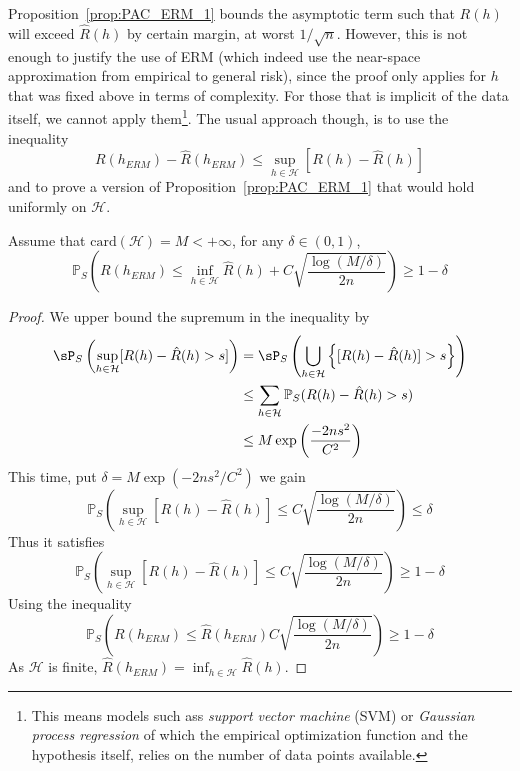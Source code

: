 \documentclass[
  journal=largetwo,
  year=2025,
  volume=37,
]{cup-journal}
\begin{document}
Proposition~\ref{prop:PAC_ERM_1} bounds the asymptotic term such that $R(h)$ will exceed $\hat{R}(h)$ by certain margin, at worst $1/\sqrt{n}$. However, this is not enough to justify the use of ERM (which indeed use the near-space approximation from empirical to general risk), since the proof only applies for $h$ that was fixed above in terms of complexity. For those that is implicit of the data itself, we cannot apply them\footnote{This means models such ass \textit{support vector machine} (SVM) or \textit{Gaussian process regression} of which the empirical optimization function and the hypothesis itself, relies on the number of data points available.}. The usual approach though, is to use the inequality 
\begin{equation}
    R(h_{ERM}) - \hat{R}(h_{ERM}) \leq \sup_{h\in\mathcal{H}} \left[R(h)-\hat{R}(h)\right]
\end{equation}
and to prove a version of Proposition~\ref{prop:PAC_ERM_1} that would hold uniformly on $\mathcal{H}$. 
\begin{theorem}
    Assume that $\mathrm{card}(\mathcal{H})=M<+\infty$, for any $\delta\in(0,1)$, 
    \begin{equation}
        \mathbb{P}_{S}\left( R(h_{ERM}) \leq \inf_{h\in\mathcal{H}} \hat{R}(h) + C\sqrt{\frac{\log{(M/\delta)}}{2n}} \right) \geq 1 - \delta
    \end{equation}
\end{theorem}
\begin{proof}
    We upper bound the supremum in the inequality by 
    \begin{equation}
        \begin{split}
            \sP_{S} \left(\sup_{h\in\mathcal{H}}[R(h)-\hat{R}(h)>s]\right)
            & = \sP_{S} \left(\bigcup_{h\in\mathcal{H}} \left\{ [R(h)-\hat{R}(h)]>s \right\} \right)\\
            & \leq \sum_{h\in\mathcal{H}} \mathbb{P}_{S}(R(h)-\hat{R}(h)>s)\\
            & \leq M\exp{\left(\frac{-2ns^2}{C^2}\right)}
        \end{split}
    \end{equation}
    This time, put $\delta = M\exp{(-2ns^2/C^2)}$ we gain 
\begin{equation}
     \mathbb{P}_{S}\left( \sup_{h\in\mathcal{H}}[R(h)-\hat{R}(h)] \leq  C\sqrt{\frac{\log{(M/\delta)}}{2n}} \right) \leq \delta
\end{equation}
Thus it satisfies 
\begin{equation}
     \mathbb{P}_{S}\left( \sup_{h\in\mathcal{H}}[R(h)-\hat{R}(h)] \leq  C\sqrt{\frac{\log{(M/\delta)}}{2n}} \right) \geq 1-\delta
\end{equation}
Using the inequality
\begin{equation}
    \mathbb{P}_{S}\left( R(h_{ERM}) \leq \hat{R}(h_{ERM})  C\sqrt{\frac{\log{(M/\delta)}}{2n}} \right) \geq 1-\delta    
\end{equation}
As $\mathcal{H}$ is finite, $\hat{R}(h_{ERM})=\inf_{h\in\mathcal{H}}\hat{R}(h)$.
\end{proof}
\end{document}
